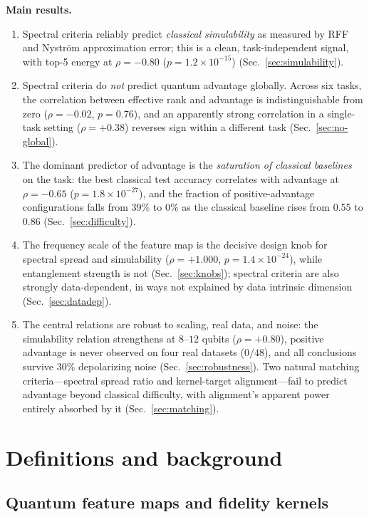 \documentclass[a4paper,unpublished,onecolumn,nopdfoutputerror,12pt]{quantumarticle}
\begin{document}
\textbf{Main results.}
\begin{enumerate}
\item Spectral criteria reliably predict \emph{classical simulability} as measured by
RFF and Nystr\"om approximation error; this is a clean, task-independent signal, with
top-5 energy at $\rho=-0.80$ ($p=1.2\times10^{-15}$) (Sec.~\ref{sec:simulability}).
\item Spectral criteria do \emph{not} predict quantum advantage globally. Across six
tasks, the correlation between effective rank and advantage is indistinguishable from
zero ($\rho=-0.02$, $p=0.76$), and an apparently strong correlation in a single-task
setting ($\rho=+0.38$) reverses sign within a different task (Sec.~\ref{sec:no-global}).
\item The dominant predictor of advantage is the \emph{saturation of classical
baselines} on the task: the best classical test accuracy correlates with advantage at
$\rho=-0.65$ ($p=1.8\times10^{-27}$), and the fraction of positive-advantage
configurations falls from 39\% to 0\% as the classical baseline rises from 0.55 to
0.86 (Sec.~\ref{sec:difficulty}).
\item The frequency scale of the feature map is the decisive design knob for spectral
spread and simulability ($\rho=+1.000$, $p=1.4\times10^{-24}$), while entanglement
strength is not (Sec.~\ref{sec:knobs}); spectral criteria are also strongly
data-dependent, in ways not explained by data intrinsic dimension
(Sec.~\ref{sec:datadep}).
\item The central relations are robust to scaling, real data, and noise: the
simulability relation strengthens at $8$--$12$ qubits ($\rho=+0.80$), positive advantage
is never observed on four real datasets ($0/48$), and all conclusions survive $30\%$
depolarizing noise (Sec.~\ref{sec:robustness}). Two natural matching criteria---spectral
spread ratio and kernel-target alignment---fail to predict advantage beyond classical
difficulty, with alignment's apparent power entirely absorbed by it
(Sec.~\ref{sec:matching}).
\end{enumerate}

\section{Definitions and background}
\label{sec:defs}

\subsection{Quantum feature maps and fidelity kernels}
\label{sec:defs-fm}
\end{document}
